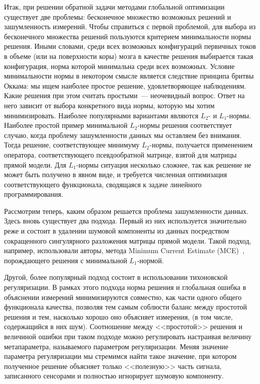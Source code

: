 Итак, при решении обратной задачи методами глобальной оптимизации существует
две проблемы: бесконечное множество возможных решений и зашумленность
измерений. Чтобы справиться с первой проблемой, для выбора из бесконечного
множества решений пользуются критерием минимальности нормы решения. Иными
словами, среди всех возможных конфигураций первичных токов в объеме (или на
поверхности коры) мозга в качестве решения выбирается такая конфигурация, норма
которой минимальна среди всех возможных.  Условие минимальности нормы в
некотором смысле является следствие принципа бритвы Оккама: мы ищем наиболее
простое решение, удовлетворяющее наблюдениям. Какие решения при этом считать
простыми~--- неочевидный вопрос.  Ответ на него зависит от выбора конкретного
вида нормы, которую мы хотим минимизировать.  Наиболее популярными вариантами
являются $L_2$- и $L_1$-нормы.  Наиболее простой пример минимальной $L_2$-нормы
решения соответствует случаю, когда проблему зашумленности данных мы оставляем
без внимания.  Тогда решение, соответствующее минимуму $L_2$-нормы, получается
применением оператора, соответствующего псевдообратной матрице, взятой для
матрицы прямой модели.  Для $L_1$-нормы ситуация несколько сложнее, так как
решение не может быть получено в явном виде, и требуется численная оптимизация
соответствующего функционала, сводящаяся к задаче линейного программирования.

Рассмотрим теперь, каким образом решается проблема зашумленности данных. Здесь
вновь существует два подхода.  Первый из них используется значительно реже и
состоит в удалении шумовой компоненты из данных посредством сокращенного
сингулярного разложения матрицы прямой модели. Такой подход, например,
использовали авторы, метода Minimum Current Estimate (MCE)~\cite{Uutela1999},
порождающего решения с минимальной $L_1$-нормой.

Другой, более популярный подход состоит в использовании тихоновской
регуляризации. В рамках этого подхода норма решения и глобальная ошибка в
объяснении измерений минимизируются совместно, как части одного общего
функционала качества, позволяя тем самым соблюсти баланс между простотой
решения и тем, насколько хорошо оно объясняет измерения, (в том числе,
содержащийся в них шум). Соотношение между <<простотой>> решения и величиной ошибки при
таком подходе можно регулировать настраивая величину метапараметра,
называемого параметром регуляризации. Меняя значение параметра регуляризации
мы стремимся найти такое значение, при котором полученное решение объясняет
только <<полезную>> часть сигнала, записанного сенсорами и полностью игнорирует
шумовую компоненту.

